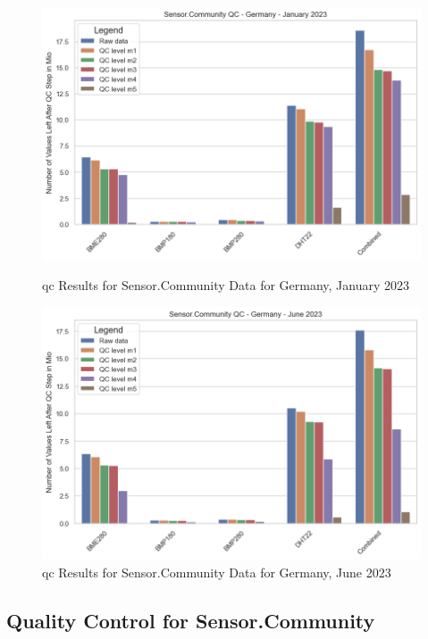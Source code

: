 \begin{figure}[htp]
    \centering
    \includegraphics[width=1\textwidth]{images/sensor_community_qc_january_23.png}
    \caption{\gls{qc} Results for Sensor.Community Data for Germany, January 2023}
    \label{fig:qc sensor community jan 23}

    \centering
    \includegraphics[width=1\textwidth]{images/sensor_community_qc_june_23.png}
    \caption{\gls{qc} Results for Sensor.Community Data for Germany, June 2023}
    \label{fig:qc sensor community june 23}
\end{figure}

\subsection{Quality Control for Sensor.Community}


